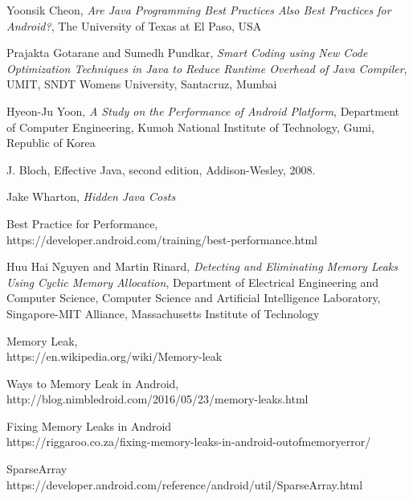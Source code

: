 \documentclass[journal]{IEEEtran}
\begin{document}
\begin{thebibliography}{1}

\bibitem{}
Yoonsik Cheon, \emph{Are Java Programming Best Practices Also Best Practices for Android?}, The University of Texas at El Paso, USA

\bibitem{}
Prajakta Gotarane and Sumedh Pundkar, \emph{Smart Coding using New Code Optimization Techniques in Java to Reduce Runtime Overhead of Java Compiler}, UMIT, SNDT Womens University, Santacruz, Mumbai

\bibitem{}
Hyeon-Ju Yoon, \emph{A Study on the Performance of Android Platform}, Department of Computer Engineering, Kumoh National Institute of Technology, Gumi, Republic of Korea 

\bibitem{}
J. Bloch, Effective Java, second edition, Addison-Wesley, 2008.

\bibitem{}
Jake Wharton, \emph{Hidden Java Costs}

\bibitem{}
Best Practice for Performance,\\
https://developer.android.com/training/best-performance.html 

\bibitem{}
Huu Hai Nguyen and Martin Rinard, \emph{Detecting and Eliminating Memory Leaks Using Cyclic Memory Allocation}, Department of Electrical Engineering and Computer Science, 
Computer Science and Artificial Intelligence Laboratory, 
Singapore-MIT Alliance, 
Massachusetts Institute of Technology

Memory Leak,\\
https://en.wikipedia.org/wiki/Memory-leak

Ways to Memory Leak in Android,\\
http://blog.nimbledroid.com/2016/05/23/memory-leaks.html

Fixing Memory Leaks in Android\\
https://riggaroo.co.za/fixing-memory-leaks-in-android-outofmemoryerror/

SparseArray\\
https://developer.android.com/reference/android/util/SparseArray.html

\end{thebibliography}
\end{document}
